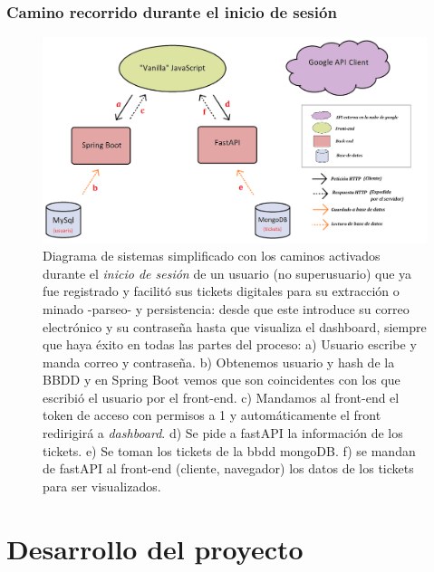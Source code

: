 \documentclass[a4paper,12pt]{report}
\begin{document}
				
		\subsection{Camino recorrido durante el inicio de sesión}
		


		\setlength{\belowcaptionskip}{3pt}
		\FloatBarrier
		\begin{figure}[H]
			\centering
			\includegraphics[width=1\textwidth]{img/diagramaSistemesAplicacioMercappCAMIINICISESSIO.png}
			\caption{Diagrama de sistemas simplificado con los caminos activados durante el \textit{inicio de sesión} de un usuario (no superusuario) que ya fue registrado y facilitó sus tickets digitales para su extracción o minado -parseo- y persistencia: desde que este introduce su correo electrónico y su contraseña hasta que visualiza el dashboard, siempre que haya éxito en todas las partes del proceso: a) Usuario escribe y manda correo y contraseña. b) Obtenemos usuario y hash de la BBDD y en Spring Boot vemos que son coincidentes con los que escribió el usuario por el front-end. c) Mandamos al front-end el token de acceso con permisos a 1 y automáticamente el front redirigirá a \textit{dashboard}. d) Se pide a fastAPI la información de los tickets. e) Se toman los tickets de la bbdd mongoDB. f) se mandan de fastAPI al front-end (cliente, navegador) los datos de los tickets para ser visualizados.}
			\label{fig:diagramaSistemesAplicacioMercappCAMIINICISESSIO} 
		\end{figure}
		\FloatBarrier
		








		
	\pagebreak
	\chapter{Desarrollo del proyecto} %
	
\end{document}
